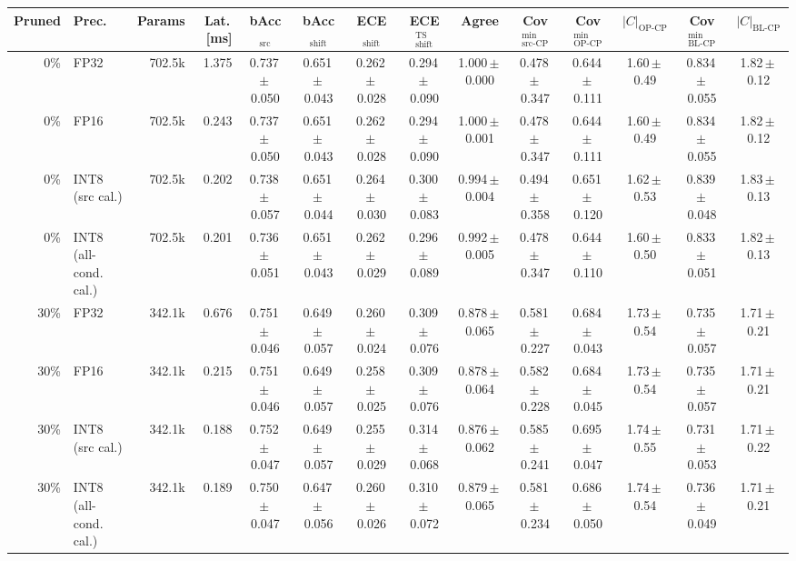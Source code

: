 \begin{tabular}{rl r r cccccccccc}
\toprule
Pruned & Prec. & Params & Lat.\,[ms] & bAcc$_{\mathrm{src}}$ & bAcc$_{\mathrm{shift}}$ & ECE$_{\mathrm{shift}}$ & ECE$^{\mathrm{TS}}_{\mathrm{shift}}$ & Agree & Cov$^{\min}_{\mathrm{src\text{-}CP}}$ & Cov$^{\min}_{\mathrm{OP\text{-}CP}}$ & $|C|_{\mathrm{OP\text{-}CP}}$ & Cov$^{\min}_{\mathrm{BL\text{-}CP}}$ & $|C|_{\mathrm{BL\text{-}CP}}$ \\
\midrule
0\% & FP32 & 702.5k & 1.375 & 0.737\,$\pm$\,0.050 & 0.651\,$\pm$\,0.043 & 0.262\,$\pm$\,0.028 & 0.294\,$\pm$\,0.090 & 1.000\,$\pm$\,0.000 & 0.478\,$\pm$\,0.347 & 0.644\,$\pm$\,0.111 & 1.60\,$\pm$\,0.49 & 0.834\,$\pm$\,0.055 & 1.82\,$\pm$\,0.12 \\
0\% & FP16 & 702.5k & 0.243 & 0.737\,$\pm$\,0.050 & 0.651\,$\pm$\,0.043 & 0.262\,$\pm$\,0.028 & 0.294\,$\pm$\,0.090 & 1.000\,$\pm$\,0.001 & 0.478\,$\pm$\,0.347 & 0.644\,$\pm$\,0.111 & 1.60\,$\pm$\,0.49 & 0.834\,$\pm$\,0.055 & 1.82\,$\pm$\,0.12 \\
0\% & INT8 (src cal.) & 702.5k & 0.202 & 0.738\,$\pm$\,0.057 & 0.651\,$\pm$\,0.044 & 0.264\,$\pm$\,0.030 & 0.300\,$\pm$\,0.083 & 0.994\,$\pm$\,0.004 & 0.494\,$\pm$\,0.358 & 0.651\,$\pm$\,0.120 & 1.62\,$\pm$\,0.53 & 0.839\,$\pm$\,0.048 & 1.83\,$\pm$\,0.13 \\
0\% & INT8 (all-cond. cal.) & 702.5k & 0.201 & 0.736\,$\pm$\,0.051 & 0.651\,$\pm$\,0.043 & 0.262\,$\pm$\,0.029 & 0.296\,$\pm$\,0.089 & 0.992\,$\pm$\,0.005 & 0.478\,$\pm$\,0.347 & 0.644\,$\pm$\,0.110 & 1.60\,$\pm$\,0.50 & 0.833\,$\pm$\,0.051 & 1.82\,$\pm$\,0.13 \\
30\% & FP32 & 342.1k & 0.676 & 0.751\,$\pm$\,0.046 & 0.649\,$\pm$\,0.057 & 0.260\,$\pm$\,0.024 & 0.309\,$\pm$\,0.076 & 0.878\,$\pm$\,0.065 & 0.581\,$\pm$\,0.227 & 0.684\,$\pm$\,0.043 & 1.73\,$\pm$\,0.54 & 0.735\,$\pm$\,0.057 & 1.71\,$\pm$\,0.21 \\
30\% & FP16 & 342.1k & 0.215 & 0.751\,$\pm$\,0.046 & 0.649\,$\pm$\,0.057 & 0.258\,$\pm$\,0.025 & 0.309\,$\pm$\,0.076 & 0.878\,$\pm$\,0.064 & 0.582\,$\pm$\,0.228 & 0.684\,$\pm$\,0.045 & 1.73\,$\pm$\,0.54 & 0.735\,$\pm$\,0.057 & 1.71\,$\pm$\,0.21 \\
30\% & INT8 (src cal.) & 342.1k & 0.188 & 0.752\,$\pm$\,0.047 & 0.649\,$\pm$\,0.057 & 0.255\,$\pm$\,0.029 & 0.314\,$\pm$\,0.068 & 0.876\,$\pm$\,0.062 & 0.585\,$\pm$\,0.241 & 0.695\,$\pm$\,0.047 & 1.74\,$\pm$\,0.55 & 0.731\,$\pm$\,0.053 & 1.71\,$\pm$\,0.22 \\
30\% & INT8 (all-cond. cal.) & 342.1k & 0.189 & 0.750\,$\pm$\,0.047 & 0.647\,$\pm$\,0.056 & 0.260\,$\pm$\,0.026 & 0.310\,$\pm$\,0.072 & 0.879\,$\pm$\,0.065 & 0.581\,$\pm$\,0.234 & 0.686\,$\pm$\,0.050 & 1.74\,$\pm$\,0.54 & 0.736\,$\pm$\,0.049 & 1.71\,$\pm$\,0.21 \\

\end{tabular}
